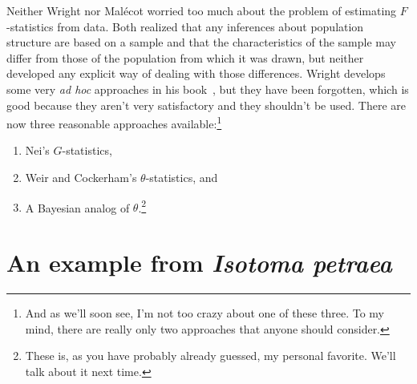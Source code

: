 \documentclass[12pt]{article}
\begin{document}
Neither Wright nor Mal{\'e}cot worried too much about the problem of
estimating $F$-statistics from data. Both realized that any inferences
about population structure are based on a sample and that the
characteristics of the sample may differ from those of the population
from which it was drawn, but neither developed any explicit way of
dealing with those differences. Wright develops some very {\it ad
  hoc\/} approaches in his book~\cite{Wright69}, but they have been
forgotten, which is good because they aren't very satisfactory and
they shouldn't be used. There are now three reasonable approaches
available:\footnote{And as we'll
  soon see, I'm not too crazy about one of these three. To my mind,
  there are really only two approaches that anyone should consider.}

\begin{enumerate}

\item Nei's $G$-statistics,

\item Weir and Cockerham's $\theta$-statistics, and

\item A Bayesian analog of $\theta$.\footnote{These is, as you have
  probably already guessed, my personal favorite. We'll talk about
  it next time.}

\end{enumerate}

\section*{An example from {\it Isotoma petraea}}
\end{document}
